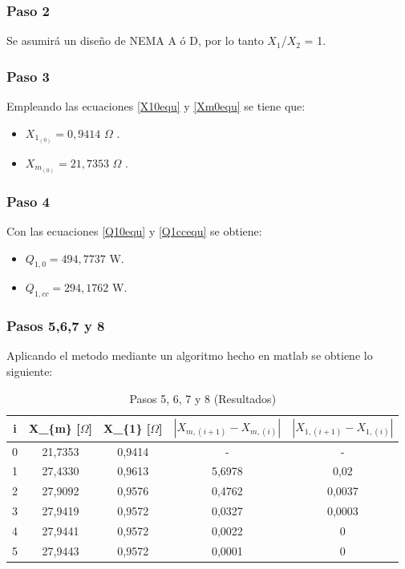 \documentclass[11pt,letterpaper]{article}     %
\begin{document}
\subsubsection{Paso 2}
Se asumirá un diseño de NEMA A ó D, por lo tanto $X_{1}$/$X_{2}$ = 1.
\subsubsection{Paso 3}
Empleando las ecuaciones \ref{X10equ} y \ref{Xm0equ} se tiene que:
\begin{itemize}
	\item $	X_{1_{(0)}} = 0,9414$ $\Omega$ .
	\item $X_{m_{(0)}} =21,7353$ $\Omega$ .
\end{itemize}
\subsubsection{Paso 4}
Con las ecuaciones \ref{Q10equ} y \ref{Q1ccequ} se obtiene:
\begin{itemize}
	\item $	Q_{1,0} = 494,7737 $ W.
	\item $Q_{1,cc} = 294,1762$ W.
\end{itemize}
\subsubsection{Pasos 5,6,7 y 8}
Aplicando el metodo mediante un algoritmo hecho en matlab se obtiene lo siguiente:
\begin{table}[H]
	\centering
	\caption{Pasos 5, 6, 7 y 8 (Resultados)}
	\label{MetodoAItera}
	\begin{tabular}{|c|c|c|c|c|}
		\hline
		\textbf{i} & \textbf{X\_\{m\} {[}$\Omega${]}} & \textbf{X\_\{1\} {[}$\Omega${]}} & \textbf{$|X_{m,(i+1)}-X_{m,(i)}|$} & \textbf{$|X_{1,(i+1)}-X_{1,(i)}|$} \\ \hline
		0          & 21,7353                          & 0,9414                           & -                                  & -                                  \\ \hline
		1          & 27,4330                          & 0,9613                           & 5,6978                             & 0,02                               \\ \hline
		2          & 27,9092                          & 0,9576                           & 0,4762                             & 0,0037                             \\ \hline
		3          & 27,9419                          & 0,9572                           & 0,0327                             & 0,0003                             \\ \hline
		4          & 27,9441                          & 0,9572                           & 0,0022                             & 0                                  \\ \hline
		5          & 27,9443                          & 0,9572                           & 0,0001                             & 0                                  \\ \hline
	\end{tabular}
\end{table}
\end{document}
